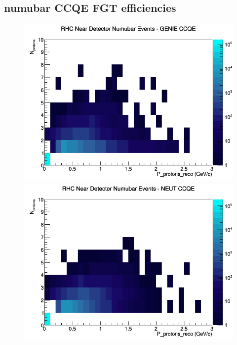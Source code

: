 \documentclass[12pt]{article}
\begin{document}
\subsection{numubar CCQE FGT efficiencies}
\begin{figure}[h]
\includegraphics[width=\linewidth]{eff_N_P/FGT/protons/CCQE_RHC_ND_numubar_N_P_GENIE.png}
\endminipage
{}
\includegraphics[width=\linewidth]{eff_N_P/FGT/protons/CCQE_RHC_ND_numubar_N_P_NEUT.png}
\endminipage
{}

\end{figure}
\end{document}
